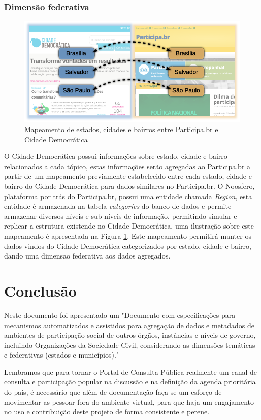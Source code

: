 \documentclass[12pt]{article}
\newcommand{\ProductDescription}{"Documento com especificações para mecanismos
  automatizados e assistidos para agregação de dados e metadados de ambientes
  de participação social de outros órgãos, instâncias e níveis de governo,
  incluindo Organizações da Sociedade Civil, considerando as dimensões
  temáticas e federativas (estados e municípios)."
}
\begin{document}
\subsubsection{Dimensão federativa}

\begin{figure}[h!]
\center
\includegraphics[scale=0.4]{mapeamento-cidades.png}
\caption{Mapeamento de estados, cidades e bairros entre Participa.br e Cidade
Democrática}
\label{mapeamento}
\end{figure}

O Cidade Democrática possui informações sobre estado, cidade e bairro
relacionados a cada tópico, estas informações serão agregadas ao Participa.br
a partir de um mapeamento previamente estabelecido entre cada estado, cidade e
bairro do Cidade Democrática para dados similares no Participa.br. O Noosfero,
plataforma por trás do Participa.br, possui uma entidade chamada {\it Region},
esta entidade é armazenada na tabela {\it categories} do banco de dados e
permite armazenar diversos níveis e sub-níveis de informação, permitindo
simular e replicar a estrutura existende no Cidade Democrática, uma ilustração
sobre este mapeamento é apresentada na Figura \ref{mapeamento}. Este
mapeamento permitirá manter os dados vindos do Cidade Democrática
categorizados por estado, cidade e bairro, dando uma dimensao federativa aos
dados agregados.

\section{Conclusão}

Neste documento foi apresentado um \ProductDescription

Lembramos que para tornar o Portal de Consulta Pública realmente um canal de
consulta e participação popular na discussão e na definição da agenda
prioritária do país, é necessário que além de documentação faça-se um esforço
de movimentar as pessoar fora do ambiente virtual, para que haja um
engajamento no uso e contribuição deste projeto de forma consistente e perene.

\newpage

\newpage
\listoffigures
\newpage
\printindex
\end{document}
